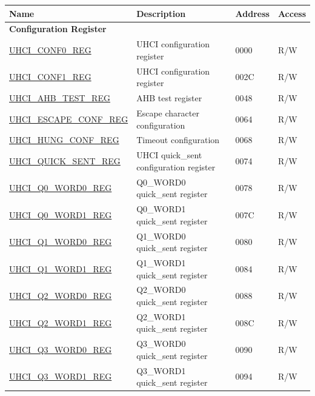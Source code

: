 \begin{longtable}{ | p{6cm} | p{7.2cm} | p{1.3cm} | p{1cm} | }
\hline\rowcolor{lightgray}
Name & Description &  Address & Access \\ \hline
\endhead
\multicolumn{4}{|l|}{\textbf{Configuration Register}} \\ \hline
\hyperref[regdesc:UHCICONF0REG]{UHCI\_CONF0\_REG} & UHCI configuration register & \hexprefix{}0000 & R/W \\ \hline
\hyperref[regdesc:UHCICONF1REG]{UHCI\_CONF1\_REG} & UHCI configuration register & \hexprefix{}002C & R/W \\ \hline
\hyperref[regdesc:UHCIAHBTESTREG]{UHCI\_AHB\_TEST\_REG} & AHB test register & \hexprefix{}0048 & R/W \\ \hline
\hyperref[regdesc:UHCIESCAPECONFREG]{UHCI\_ESCAPE\_CONF\_REG} & Escape character configuration & \hexprefix{}0064 & R/W \\ \hline
\hyperref[regdesc:UHCIHUNGCONFREG]{UHCI\_HUNG\_CONF\_REG} & Timeout configuration & \hexprefix{}0068 & R/W \\ \hline
\hyperref[regdesc:UHCIQUICKSENTREG]{UHCI\_QUICK\_SENT\_REG} & UHCI quick\_sent configuration register & \hexprefix{}0074 & R/W \\ \hline
\hyperref[regdesc:UHCIQ0WORD0REG]{UHCI\_Q0\_WORD0\_REG} & Q0\_WORD0 quick\_sent register & \hexprefix{}0078 & R/W \\ \hline
\hyperref[regdesc:UHCIQ0WORD1REG]{UHCI\_Q0\_WORD1\_REG} & Q0\_WORD1 quick\_sent register & \hexprefix{}007C & R/W \\ \hline
\hyperref[regdesc:UHCIQ1WORD0REG]{UHCI\_Q1\_WORD0\_REG} & Q1\_WORD0 quick\_sent register & \hexprefix{}0080 & R/W \\ \hline
\hyperref[regdesc:UHCIQ1WORD1REG]{UHCI\_Q1\_WORD1\_REG} & Q1\_WORD1 quick\_sent register & \hexprefix{}0084 & R/W \\ \hline
\hyperref[regdesc:UHCIQ2WORD0REG]{UHCI\_Q2\_WORD0\_REG} & Q2\_WORD0 quick\_sent register & \hexprefix{}0088 & R/W \\ \hline
\hyperref[regdesc:UHCIQ2WORD1REG]{UHCI\_Q2\_WORD1\_REG} & Q2\_WORD1 quick\_sent register & \hexprefix{}008C & R/W \\ \hline
\hyperref[regdesc:UHCIQ3WORD0REG]{UHCI\_Q3\_WORD0\_REG} & Q3\_WORD0 quick\_sent register & \hexprefix{}0090 & R/W \\ \hline
\hyperref[regdesc:UHCIQ3WORD1REG]{UHCI\_Q3\_WORD1\_REG} & Q3\_WORD1 quick\_sent register & \hexprefix{}0094 & R/W \\ \hline

\end{longtable}
